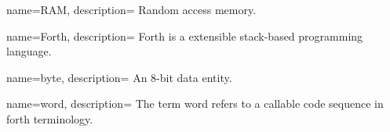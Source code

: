 
 {
    name={RAM},
    description={
      Random access memory.
      \nopostdesc
    }
}

 {
    name={Forth},
    description={
      Forth is a extensible stack-based programming language.
      \nopostdesc
    }
}
 
 {
    name={byte},
    description={
      An 8-bit data entity.
      \nopostdesc
    }
}

 {
    name={word},
    description={
      The term word  refers to a callable code sequence in \Gls{forth} terminology.
      \nopostdesc
    }
}

